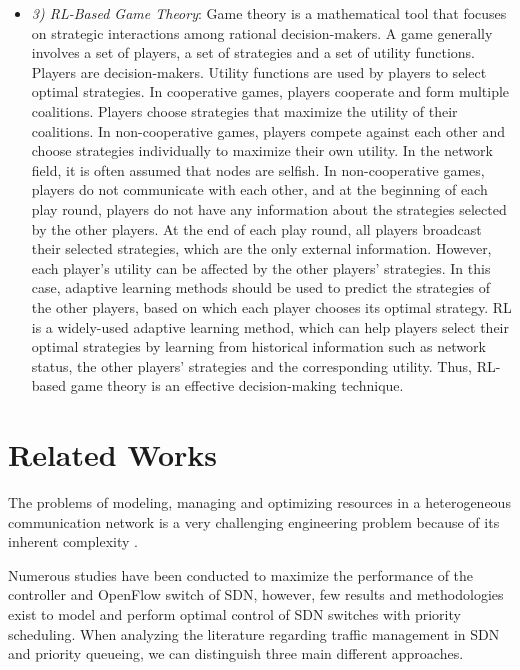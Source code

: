 \begin{itemize}
\item[]\textit{3)	RL-Based Game Theory}: Game theory is a mathematical tool that focuses on strategic interactions among rational decision-makers. A game generally involves a set of players, a set of strategies and a set of utility functions. Players are decision-makers. Utility functions are used by players to select optimal strategies. In cooperative games, players cooperate and form multiple coalitions. Players choose strategies that maximize the utility of their coalitions. In non-cooperative games, players compete against each other and choose strategies individually to maximize their own utility. In the network field, it is often assumed that nodes are selfish.
In non-cooperative games, players do not communicate with each other, and at the beginning of each play round, players do not have any information about the strategies selected by the other players. At the end of each play round, all players broadcast their selected strategies, which are the only external information. However, each player’s utility can be affected by the other players’ strategies. In this case, adaptive learning methods should be used to predict the strategies of the other players, based on which each player chooses its optimal strategy. RL is a widely-used adaptive learning method, which can help players select their optimal strategies by learning from historical information such as network status, the other players’ strategies and the corresponding utility. Thus, RL-based game theory is an effective decision-making technique.
\end{itemize}

\section{Related Works} \label{RelWorks}
The problems of modeling, managing and optimizing resources in a heterogeneous communication network is a very challenging engineering problem because of its inherent complexity \cite{Neely2010,Lemeshko2019,Tan2017,Abdelmoniem2019}.

Numerous studies have been conducted to maximize the performance of the controller and OpenFlow switch of SDN, however, few results and methodologies exist to model and perform optimal control of SDN switches with priority scheduling. When analyzing the literature regarding traffic management in SDN and priority queueing, we can distinguish three main different approaches.

